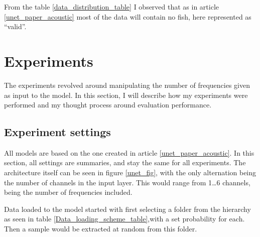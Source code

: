         From the table \ref{data_distribution_table} I observed that as in article \ref{unet_paper_acoustic} most of the data will contain no fish, here represented as “valid”.

\clearpage
\section{Experiments}
    The experiments revolved around manipulating the number of frequencies given as input to the model. In this section, I will describe how my experiments were performed and my thought process around evaluation performance. 
    
    \subsection{Experiment settings} \label{Experiment settings}
        All models are based on the one created in article \ref{unet_paper_acoustic}. In this section, all settings are summaries, and stay the same for all experiments.
        The architecture itself can be seen in figure \ref{unet_fig}, with the only alternation being the number of channels in the input layer. This would range from 1…6 channels, being the number of frequencies included. 
        
        Data loaded to the model started with first selecting a folder from the hierarchy as seen in table \ref{Data_loading_scheme_table},with a set probability for each. Then a sample would be extracted at random from this folder. 
        
